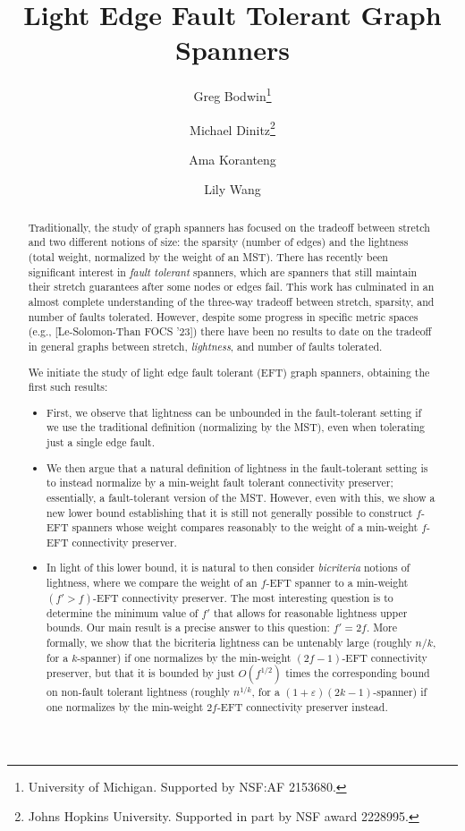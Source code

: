\documentclass{article}
\title{Light Edge Fault Tolerant Graph Spanners}
\author{Greg Bodwin\thanks{University of Michigan. 
 Supported by NSF:AF 2153680.} \and Michael Dinitz\thanks{Johns Hopkins University.  Supported in part by NSF award 2228995.} \and Ama Koranteng\footnotemark[2] \and Lily Wang\footnotemark[1]}
\date{}
\newif\ifshort
\theoremstyle{plain}
\theoremstyle{definition}
\newcommand{\eps}{\varepsilon}
\begin{document}
\allowdisplaybreaks
\ifshort \else
\begin{titlepage}
\fi
\maketitle

\begin{abstract}
    Traditionally, the study of graph spanners has focused on the tradeoff between stretch and two different notions of size: the sparsity (number of edges) and the lightness (total weight, normalized by the weight of an MST).  There has recently been significant interest in \emph{fault tolerant} spanners, which are spanners that still maintain their stretch guarantees after some nodes or edges fail.  This work has culminated in an almost complete understanding of the three-way tradeoff between stretch, sparsity, and number of faults tolerated.  However, despite some progress in specific metric spaces (e.g., [Le-Solomon-Than FOCS '23]) there have been no results to date on the tradeoff in general graphs between stretch, \emph{lightness}, and number of faults tolerated.

    We initiate the study of light edge fault tolerant (EFT) graph spanners, obtaining the first such results:
    \begin{itemize}
    \item First, we observe that lightness can be unbounded in the fault-tolerant setting if we use the traditional definition (normalizing by the MST), even when tolerating just a single edge fault.
    
    \item We then argue that a natural definition of lightness in the fault-tolerant setting is to instead normalize by a min-weight fault tolerant connectivity preserver; essentially, a fault-tolerant version of the MST.
    However, even with this, we show a new lower bound establishing that it is still not generally possible to construct $f$-EFT spanners whose weight compares reasonably to the weight of a min-weight $f$-EFT connectivity preserver.
    
    \item In light of this lower bound, it is natural to then consider \emph{bicriteria} notions of lightness, where we compare the weight of an $f$-EFT spanner to a min-weight $(f' > f)$-EFT connectivity preserver.
    The most interesting question is to determine the minimum value of $f'$ that allows for reasonable lightness upper bounds.
    Our main result is a precise answer to this question: $f' = 2f$.
    More formally, we show that the bicriteria lightness can be untenably large (roughly $n/k$, for a $k$-spanner) if one normalizes by the min-weight $(2f-1)$-EFT connectivity preserver, but that it is bounded by just $O(f^{1/2})$ times the corresponding bound on non-fault tolerant lightness (roughly $n^{1/k}$, for a $(1+\eps)(2k-1)$-spanner) if one normalizes by the min-weight $2f$-EFT connectivity preserver instead.
    \end{itemize}


\end{abstract}
\end{titlepage}
\end{document}
